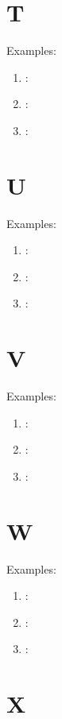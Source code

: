\section*{T}

Examples:
\begin{enumerate}
    \item \textbf{}: \textipa{[]}
    \item \textbf{}: \textipa{[]}
    \item \textbf{}: \textipa{[]}
\end{enumerate}

\section*{U}

Examples:
\begin{enumerate}
    \item \textbf{}: \textipa{[]}
    \item \textbf{}: \textipa{[]}
    \item \textbf{}: \textipa{[]}
\end{enumerate}

\section*{V}

Examples:
\begin{enumerate}
    \item \textbf{}: \textipa{[]}
    \item \textbf{}: \textipa{[]}
    \item \textbf{}: \textipa{[]}
\end{enumerate}

\section*{W}

Examples:
\begin{enumerate}
    \item \textbf{}: \textipa{[]}
    \item \textbf{}: \textipa{[]}
    \item \textbf{}: \textipa{[]}
\end{enumerate}

\section*{X}

